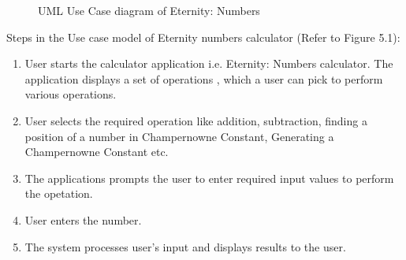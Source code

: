 \documentclass[12pt, a4paper]{report}
\begin{document}
\begin{figure}[h]
    \centering
    \caption{UML Use Case diagram of Eternity: Numbers}
    \label{fig:UML Use Case diagram of Eternity: Numbers}
\end{figure}

Steps in the Use case model of Eternity numbers calculator (Refer to Figure 5.1):
\begin{enumerate}

    \item User starts the calculator application i.e. Eternity: Numbers calculator. The application displays a set of operations , which a user can pick to perform various operations.
    \item User selects the required operation like addition, subtraction, finding a position of a number in Champernowne Constant, Generating a Champernowne Constant etc.
    \item The applications prompts the user to enter required input values to perform the opetation.
    \item User enters the number.
    \item The system processes user's input and displays results to the user.
\end{enumerate}
\end{document}
